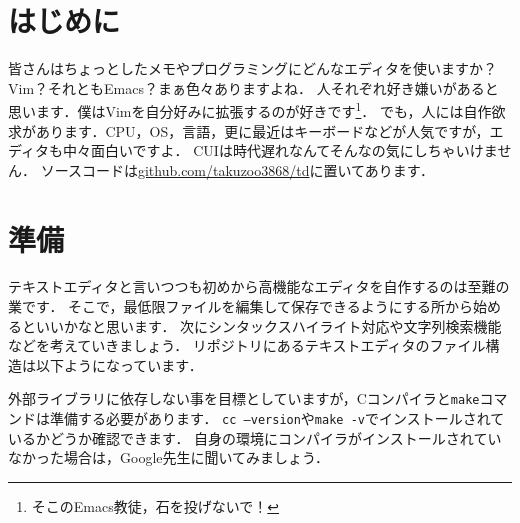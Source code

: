 \section{はじめに}
皆さんはちょっとしたメモやプログラミングにどんなエディタを使いますか？Vim？それともEmacs？まぁ色々ありますよね．
人それぞれ好き嫌いがあると思います．僕はVimを自分好みに拡張するのが好きです\footnote{そこのEmacs教徒，石を投げないで！}．
でも，人には自作欲求があります．CPU，OS，言語，更に最近はキーボードなどが人気ですが，エディタも中々面白いですよ．
CUIは時代遅れなんてそんなの気にしちゃいけません．
ソースコードは\href{https://github.com/takuzoo3868/takdit}{github.com/takuzoo3868/td}に置いてあります．

\section{準備}
テキストエディタと言いつつも初めから高機能なエディタを自作するのは至難の業です．
そこで，最低限ファイルを編集して保存できるようにする所から始めるといいかなと思います．
次にシンタックスハイライト対応や文字列検索機能などを考えていきましょう．
リポジトリにあるテキストエディタのファイル構造は以下ようになっています．

\begin{figure}[H]
\end{figure}
外部ライブラリに依存しない事を目標としていますが，Cコンパイラと\texttt{make}コマンドは準備する必要があります．
\texttt{cc --version}や\texttt{make -v}でインストールされているかどうか確認できます．
自身の環境にコンパイラがインストールされていなかった場合は，Google先生に聞いてみましょう．

